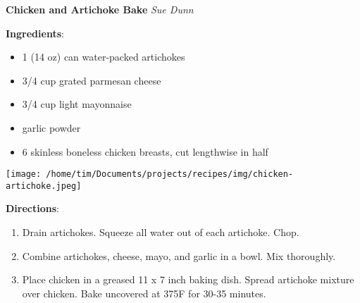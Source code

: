 \documentclass[11pt, twoside, openany]{book}
\begin{document}
\noindent\begin{minipage}[t]{\linewidth}%
{\Large\textbf{Chicken and Artichoke Bake}} \label{chicken-and-artichoke-bake}\hfill\textit{Sue Dunn}\\
\noindent\begin{minipage}[t]{0.78\linewidth}%
\textbf{Ingredients}:\vspace{-3mm}
\begin{multicols}{2}
\begin{itemize}\setlength\itemsep{-1mm}
\item 1 (14 oz) can water-packed artichokes
\item 3/4 cup grated parmesan cheese
\item 3/4 cup light mayonnaise
\item garlic powder
\item 6 skinless boneless chicken breasts, cut lengthwise in half
\end{itemize}
\end{multicols}
\end{minipage}
\noindent\begin{minipage}[t]{0.18\linewidth}
\centering \strut\vspace*{-\baselineskip}\newline
\texttt{[image: /home/tim/Documents/projects/recipes/img/chicken-artichoke.jpeg]}\\
\end{minipage}\vspace{3mm}
\textbf{Directions}:
\vspace{-3mm}\begin{enumerate}\setlength\itemsep{-1mm}
\item Drain artichokes. Squeeze all water out of each artichoke. Chop.
\item Combine artichokes, cheese, mayo, and garlic in a bowl. Mix thoroughly.
\item Place chicken in a greased 11 x 7 inch baking dish. Spread artichoke mixture over chicken. Bake uncovered at 375F for 30-35 minutes.
\end{enumerate}
\end{minipage}\vspace{8mm}
\end{document}
